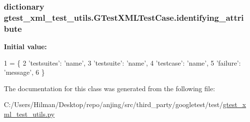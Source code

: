\subsubsection[{identifying\+\_\+attribute}]{\setlength{\rightskip}{0pt plus 5cm}dictionary gtest\+\_\+xml\+\_\+test\+\_\+utils.\+G\+Test\+X\+M\+L\+Test\+Case.\+identifying\+\_\+attribute\hspace{0.3cm}{\ttfamily [static]}}\label{classgtest__xml__test__utils_1_1_g_test_x_m_l_test_case_a0e3a4e84e18f29d2248dcd670a0a6ae6}
{\bfseries Initial value\+:}
\begin{DoxyCode}
1 = \{
2     \textcolor{stringliteral}{'testsuites'}: \textcolor{stringliteral}{'name'},
3     \textcolor{stringliteral}{'testsuite'}: \textcolor{stringliteral}{'name'},
4     \textcolor{stringliteral}{'testcase'}:  \textcolor{stringliteral}{'name'},
5     \textcolor{stringliteral}{'failure'}:   \textcolor{stringliteral}{'message'},
6     \}
\end{DoxyCode}


The documentation for this class was generated from the following file\+:\begin{DoxyCompactItemize}
\item 
C\+:/\+Users/\+Hilman/\+Desktop/repo/anjing/src/third\+\_\+party/googletest/test/\hyperlink{gtest__xml__test__utils_8py}{gtest\+\_\+xml\+\_\+test\+\_\+utils.\+py}\end{DoxyCompactItemize}
